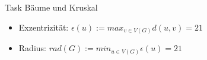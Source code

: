 \begin{frame}[allowframebreaks]{Task \thesection}{Bäume und Kruskal}
\begin{solutionnoinc}
{\begin{minipage}[t]{22cm}
          \end{minipage}
      }
    \end{solutionnoinc}
    \begin{solution}
      \begin{itemize}
        \item \alert{Exzentrizität:} $\epsilon(u) := max_{v\in V(G)} d(u,v) = 21$
        \item \alert{Radius:} $rad(G) := min_{u\in V(G)} \epsilon(u) = 21$
      \end{itemize}
    \end{solution}
\end{frame}
